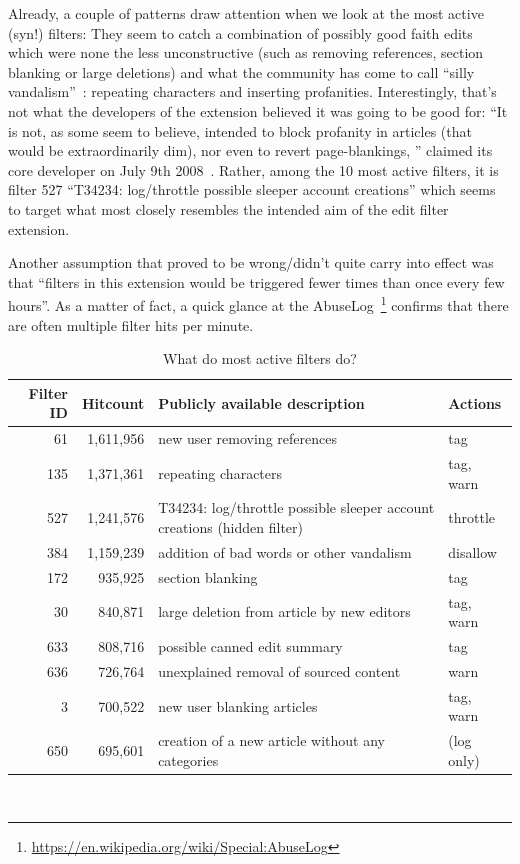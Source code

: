 Already, a couple of patterns draw attention when we look at the most active (syn!) filters:
They seem to catch a combination of possibly good faith edits which were none the less unconstructive (such as removing references, section blanking or large deletions)
and what the community has come to call ``silly vandalism''~\cite{Wikipedia:VandalismTypes}: repeating characters and inserting profanities.
Interestingly, that's not what the developers of the extension believed it was going to be good for:
``It is not, as some seem to believe, intended to block profanity in articles (that would be extraordinarily dim), nor even to revert page-blankings, '' claimed its core developer on July 9th 2008~\cite{Wikipedia:EditFilterTalkArchive1}.
Rather, among the 10 most active filters, it is filter 527 ``T34234: log/throttle possible sleeper account creations'' which seems to target what most closely resembles the intended aim of the edit filter extension. %

Another assumption that proved to be wrong/didn't quite carry into effect was that ``filters in this extension would be triggered fewer times than once every few hours''.
As a matter of fact, a quick glance at the AbuseLog~\footnote{\url{https://en.wikipedia.org/wiki/Special:AbuseLog}} confirms that there are often multiple filter hits per minute.

\begin{table}
  \centering
    \begin{tabular}{r r p{8cm} p{2cm} }
        Filter ID & Hitcount & Publicly available description & Actions \\
    \hline
       61 & 1,611,956 & new user removing references & tag \\
      135 & 1,371,361 & repeating characters & tag, warn \\
      527 & 1,241,576 & T34234: log/throttle possible sleeper account creations (hidden filter) & throttle \\
      384 & 1,159,239 & addition of bad words or other vandalism & disallow \\
      172 & 935,925 & section blanking & tag \\
       30 & 840,871 & large deletion from article by new editors & tag, warn \\
      633 & 808,716 & possible canned edit summary & tag \\
      636 & 726,764 & unexplained removal of sourced content & warn \\
        3 & 700,522 & new user blanking articles & tag, warn \\
      650 & 695,601 & creation of a new article without any categories & (log only) \\
  \end{tabular}
  \caption{What do most active filters do?}~\label{tab:most-active-actions}
\end{table}

